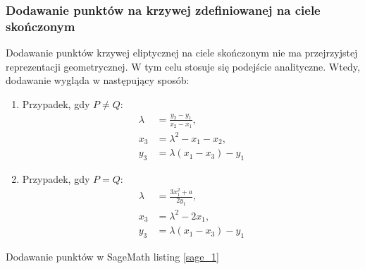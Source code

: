\subsubsection{Dodawanie punktów na krzywej zdefiniowanej na ciele skończonym}
Dodawanie punktów krzywej eliptycznej na ciele skończonym nie ma przejrzyjstej
reprezentacji geometrycznej.
W tym celu stosuje się podejście analityczne.
Wtedy, dodawanie wygląda w następujący sposób:
\begin{enumerate}
    \item Przypadek, gdy \( P \neq Q \):
    \begin{align}
        \lambda & = \frac{y_2 - y_1}{x_2 - x_1}, \\
        x_3     & = \lambda^2 - x_1 - x_2,       \\
        y_3     & = \lambda(x_1 - x_3) - y_1
    \end{align}
    \item Przypadek, gdy \( P = Q \):
    \begin{align*}
        \lambda & = \frac{3x_1^2 + a}{2y_1}, \\
        x_3     & = \lambda^2 - 2x_1,        \\
        y_3     & = \lambda(x_1 - x_3) - y_1
    \end{align*}
\end{enumerate}
Dodawanie punktów w SageMath listing \ref{sage_1}

